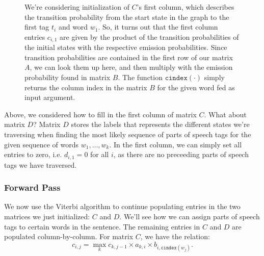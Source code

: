 \documentclass[12pt]{article}
\begin{document}
\begin{figure}[h!]
\begin{center}
    \caption{\small We're considering initialization of $C$'s first column, which describes the transition probability from the start state in the graph to the first tag $t_i$ and word $w_1$. So, it turns out that the first column entries $c_{i, 1}$ are given by the product of the transition probabilities of the initial states with the respective emission probabilities. Since transition probabilities are contained in the first row of our matrix $A$, we can look them up here, and then multiply with the emission probability found in matrix $B$. The function $\texttt{cindex}(\cdot)$ simply returns the column index in the matrix $B$ for the given word fed as input argument.}
  \end{center}
\end{figure}

Above, we considered how to fill in the first column of matrix $C$. What about matrix $D$? Matrix $D$ stores the labels that represents the different states we're traversing when finding the most likely sequence of parts of speech tags for the given sequence of words $w_1, \ldots, w_k$. In the first column, we can simply set all entries to zero, i.e. $d_{i,1} = 0$ for all $i$, as there are no preceeding parts of speech tags we have traversed.

\subsubsection{Forward Pass}
We now use the Viterbi algorithm to continue populating entries in the two matrices we just initialized: $C$ and $D$. We'll see how we can assign parts of speech tags to certain words in the sentence. The remaining entries in $C$ and $D$ are populated column-by-column. For matrix $C$, we have the relation:
\[
  c_{i,j} = \max_k c_{k, j-1} \times a_{k,i} \times b_{i, \texttt{cindex}(w_j)}.
\]
\end{document}
